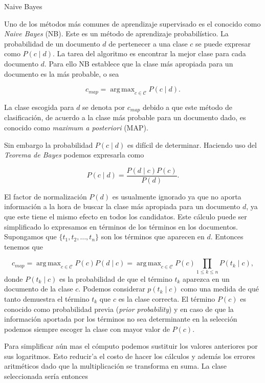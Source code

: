 \documentclass{llncs}
\DeclareMathOperator*{\argmax}{arg\,max}
\begin{document}
	\begin{subsection}{Naive Bayes}

		Uno de los m\'etodos m\'as comunes de aprendizaje supervisado es el conocido como \emph{Naive Bayes} (NB). Este es un m\'etodo de aprendizaje probabil\'istico. La probabilidad de un documento $d$ de pertenecer a una clase $c$ se puede expresar como $P(c\mid d)$. La tarea del algoritmo es encontrar la mejor clase para cada documento $d$. Para ello NB establece que la clase m\'as apropiada para un documento es la m\'as probable, o sea
		
		\[
		c_{map} = \argmax_{c\in\mathcal{C}} P(c \mid d).
		\]
		
		La clase escogida para $d$ se denota por $c_{map}$ debido a que este m\'etodo de clasificaci\'on, de acuerdo a la clase m\'as probable para un documento dado, es conocido como \emph{maximum a posteriori} (MAP).
		
		Sin embargo la probabilidad $P(c \mid d)$ es dif\'icil de determinar. Haciendo uso del \emph{Teorema de Bayes} podemos expresarla como
		
		\[
		P(c \mid d) =\frac{ P(d\mid c) P(c)}{P(d)}.
		\]
		
		El factor de normalizaci\'on $P(d)$ es usualmente ignorado ya que no aporta informaci\'on a la hora de buscar la clase m\'as apropiada para un documento $d$, ya que este tiene el mismo efecto en todos los candidatos. Este c\'alculo puede ser simplificado lo expresamos en t\'erminos de los t\'erminos en los documentos. Supongamos que $\{t_1, t_2, \dots , t_n \}$ son los t\'erminos que aparecen en $d$. Entonces tenemos que  
		
		\[
			c_{map} = \argmax_{c\in\mathcal{C}} P(c) P(d \mid c) = \argmax_{c\in\mathcal{C}} P(c) \prod_{1\leq k\leq n} P(t_k \mid c),
		\]
		donde $P(t_k \mid c)$ es la probabilidad de que el t\'ermino $t_k$ aparezca en un documento de la clase $c$. Podemos considerar $p(t_k \mid c)$ como una medida de qu\'e tanto demuestra el t\'ermino $t_k$ que $c$ es la clase correcta. El t\'ermino $P(c)$ es conocido como probabilidad previa (\emph{prior probability}) y en caso de que la informaci\'on aportada por los t\'erminos no sea determinante en la selecci\'on podemos siempre escoger la clase con mayor valor de $P(c)$.
		
		Para simplificar a\'un mas el c\'omputo podemos sustituir los valores anteriores por sus logaritmos. Esto reducir'a el costo de hacer los c\'alculos y adem\'as los errores aritm\'eticos dado que la multiplicaci\'on se transforma en suma. La clase seleccionada ser\'ia entonces
		

\end{subsection}
\end{document}

